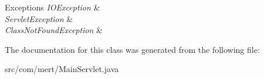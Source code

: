 \begin{DoxyExceptions}{Exceptions}
{\em I\+O\+Exception} & \\
\hline
{\em Servlet\+Exception} & \\
\hline
{\em Class\+Not\+Found\+Exception} & \\
\hline
\end{DoxyExceptions}


The documentation for this class was generated from the following file\+:\begin{DoxyCompactItemize}
\item 
src/com/mert/Main\+Servlet.\+java\end{DoxyCompactItemize}
